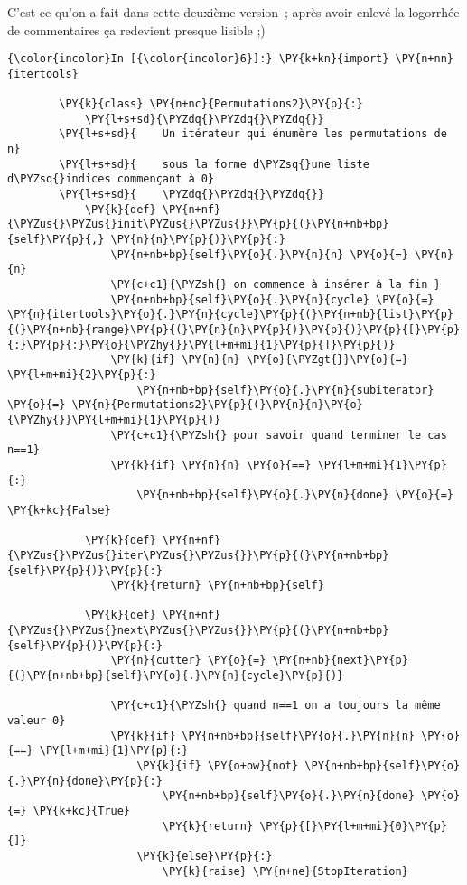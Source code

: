     C'est ce qu'on a fait dans cette deuxième version~; après avoir enlevé
la logorrhée de commentaires ça redevient presque lisible ;)

    \begin{Verbatim}[commandchars=\\\{\},frame=single,framerule=0.3mm,rulecolor=\color{cellframecolor}]
{\color{incolor}In [{\color{incolor}6}]:} \PY{k+kn}{import} \PY{n+nn}{itertools}
        
        \PY{k}{class} \PY{n+nc}{Permutations2}\PY{p}{:}
            \PY{l+s+sd}{\PYZdq{}\PYZdq{}\PYZdq{}}
        \PY{l+s+sd}{    Un itérateur qui énumère les permutations de n}
        \PY{l+s+sd}{    sous la forme d\PYZsq{}une liste d\PYZsq{}indices commençant à 0}
        \PY{l+s+sd}{    \PYZdq{}\PYZdq{}\PYZdq{}}
            \PY{k}{def} \PY{n+nf}{\PYZus{}\PYZus{}init\PYZus{}\PYZus{}}\PY{p}{(}\PY{n+nb+bp}{self}\PY{p}{,} \PY{n}{n}\PY{p}{)}\PY{p}{:}
                \PY{n+nb+bp}{self}\PY{o}{.}\PY{n}{n} \PY{o}{=} \PY{n}{n}
                \PY{c+c1}{\PYZsh{} on commence à insérer à la fin }
                \PY{n+nb+bp}{self}\PY{o}{.}\PY{n}{cycle} \PY{o}{=} \PY{n}{itertools}\PY{o}{.}\PY{n}{cycle}\PY{p}{(}\PY{n+nb}{list}\PY{p}{(}\PY{n+nb}{range}\PY{p}{(}\PY{n}{n}\PY{p}{)}\PY{p}{)}\PY{p}{[}\PY{p}{:}\PY{p}{:}\PY{o}{\PYZhy{}}\PY{l+m+mi}{1}\PY{p}{]}\PY{p}{)}
                \PY{k}{if} \PY{n}{n} \PY{o}{\PYZgt{}}\PY{o}{=} \PY{l+m+mi}{2}\PY{p}{:}
                    \PY{n+nb+bp}{self}\PY{o}{.}\PY{n}{subiterator} \PY{o}{=} \PY{n}{Permutations2}\PY{p}{(}\PY{n}{n}\PY{o}{\PYZhy{}}\PY{l+m+mi}{1}\PY{p}{)}
                \PY{c+c1}{\PYZsh{} pour savoir quand terminer le cas n==1}
                \PY{k}{if} \PY{n}{n} \PY{o}{==} \PY{l+m+mi}{1}\PY{p}{:}
                    \PY{n+nb+bp}{self}\PY{o}{.}\PY{n}{done} \PY{o}{=} \PY{k+kc}{False}
        
            \PY{k}{def} \PY{n+nf}{\PYZus{}\PYZus{}iter\PYZus{}\PYZus{}}\PY{p}{(}\PY{n+nb+bp}{self}\PY{p}{)}\PY{p}{:}
                \PY{k}{return} \PY{n+nb+bp}{self}
        
            \PY{k}{def} \PY{n+nf}{\PYZus{}\PYZus{}next\PYZus{}\PYZus{}}\PY{p}{(}\PY{n+nb+bp}{self}\PY{p}{)}\PY{p}{:}
                \PY{n}{cutter} \PY{o}{=} \PY{n+nb}{next}\PY{p}{(}\PY{n+nb+bp}{self}\PY{o}{.}\PY{n}{cycle}\PY{p}{)}
        
                \PY{c+c1}{\PYZsh{} quand n==1 on a toujours la même valeur 0}
                \PY{k}{if} \PY{n+nb+bp}{self}\PY{o}{.}\PY{n}{n} \PY{o}{==} \PY{l+m+mi}{1}\PY{p}{:}
                    \PY{k}{if} \PY{o+ow}{not} \PY{n+nb+bp}{self}\PY{o}{.}\PY{n}{done}\PY{p}{:}
                        \PY{n+nb+bp}{self}\PY{o}{.}\PY{n}{done} \PY{o}{=} \PY{k+kc}{True}
                        \PY{k}{return} \PY{p}{[}\PY{l+m+mi}{0}\PY{p}{]}
                    \PY{k}{else}\PY{p}{:}
                        \PY{k}{raise} \PY{n+ne}{StopIteration}
        

\end{Verbatim}
